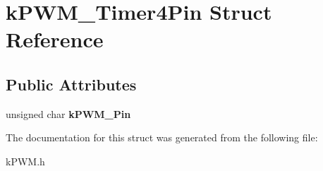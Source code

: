 \hypertarget{structkPWM__Timer4Pin}{}\section{k\+P\+W\+M\+\_\+\+Timer4\+Pin Struct Reference}
\label{structkPWM__Timer4Pin}
\subsection*{Public Attributes}
\begin{DoxyCompactItemize}
\item 
unsigned char {\bfseries k\+P\+W\+M\+\_\+\+Pin}\hypertarget{structkPWM__Timer4Pin_a4f0a534af344928bc78842468b03d488}{}\label{structkPWM__Timer4Pin_a4f0a534af344928bc78842468b03d488}

\end{DoxyCompactItemize}


The documentation for this struct was generated from the following file\+:\begin{DoxyCompactItemize}
\item 
k\+P\+W\+M.\+h\end{DoxyCompactItemize}
